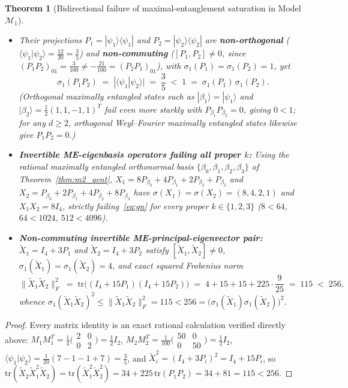 \documentclass[11pt,a4paper]{article}
\theoremstyle{plain}
\newtheorem{theorem}{Theorem}[section]
\theoremstyle{definition}
\newcommand{\tr}{\mathrm{tr}}
\begin{document}
\begin{theorem}[Bidirectional failure of maximal-entanglement saturation in Model $\mathcal{M}_1$]
\begin{enumerate}
\begin{itemize}
      \item Their projections $P_1 = |\psi_1\rangle\langle\psi_1|$ and $P_2 = |\psi_2\rangle\langle\psi_2|$ are \textbf{non-orthogonal} ($\langle\psi_1|\psi_2\rangle = \frac{12}{20} = \frac{3}{5}$) and \textbf{non-commuting} ($[P_1, P_2] \ne 0$, since $(P_1 P_2)_{01} = \frac{3}{100} \ne -\frac{21}{100} = (P_2 P_1)_{01}$), with $\sigma_1(P_1) = \sigma_1(P_2) = 1$, yet
      \[
        \sigma_1(P_1 P_2) \;=\; |\langle\psi_1|\psi_2\rangle| \;=\; \frac{3}{5} \;<\; 1 \;=\; \sigma_1(P_1)\,\sigma_1(P_2).
      \]
      (Orthogonal maximally entangled states such as $|\beta_1\rangle = |\psi_1\rangle$ and $|\beta_2\rangle = \frac{1}{2}(1,1,-1,1)^T$ fail even more starkly with $P_{\beta_1} P_{\beta_2} = 0$, giving $0 < 1$; for any $d \ge 2$, orthogonal Weyl--Fourier maximally entangled states likewise give $P_1 P_2 = 0$.)
      \item \textbf{Invertible ME-eigenbasis operators failing all proper $k$:} Using the rational maximally entangled orthonormal basis $\{\beta_0, \beta_1, \beta_2, \beta_3\}$ of Theorem~\ref{thm:m2_qent}, $X_1 = 8 P_{\beta_0} + 4 P_{\beta_1} + 2 P_{\beta_2} + P_{\beta_3}$ and $X_2 = P_{\beta_0} + 2 P_{\beta_1} + 4 P_{\beta_2} + 8 P_{\beta_3}$ have $\sigma(X_1) = \sigma(X_2) = (8,4,2,1)$ and $X_1 X_2 = 8 I_4$, strictly failing~\eqref{eq:gn} for every proper $k \in \{1,2,3\}$ ($8 < 64$, $64 < 1024$, $512 < 4096$).
      \item \textbf{Non-commuting invertible ME-principal-eigenvector pair:} $\widetilde{X}_1 = I_4 + 3 P_1$ and $\widetilde{X}_2 = I_4 + 3 P_2$ satisfy $[\widetilde{X}_1, \widetilde{X}_2] \ne 0$, $\sigma_1(\widetilde{X}_1) = \sigma_1(\widetilde{X}_2) = 4$, and exact squared Frobenius norm
      \[
        \|\widetilde{X}_1 \widetilde{X}_2\|_F^2 \;=\; \tr\bigl((I_4 + 15 P_1)(I_4 + 15 P_2)\bigr) \;=\; 4 + 15 + 15 + 225 \cdot \frac{9}{25} \;=\; 115 \;<\; 256,
      \]
      whence $\sigma_1(\widetilde{X}_1 \widetilde{X}_2)^2 \le \|\widetilde{X}_1 \widetilde{X}_2\|_F^2 = 115 < 256 = \bigl(\sigma_1(\widetilde{X}_1)\sigma_1(\widetilde{X}_2)\bigr)^2$.
    \end{itemize}
\end{enumerate}
\end{theorem}
\begin{proof}
Every matrix identity is an exact rational calculation verified directly above: $M_1 M_1^T = \frac{1}{4}\bigl(\begin{smallmatrix}2 & 0\\ 0 & 2\end{smallmatrix}\bigr) = \frac{1}{2} I_2$, $M_2 M_2^T = \frac{1}{100}\bigl(\begin{smallmatrix}50 & 0\\ 0 & 50\end{smallmatrix}\bigr) = \frac{1}{2} I_2$, $\langle\psi_1|\psi_2\rangle = \frac{1}{20}(7 - 1 - 1 + 7) = \frac{3}{5}$, and $\widetilde{X}_i^2 = (I_4 + 3 P_i)^2 = I_4 + 15 P_i$, so $\tr(\widetilde{X}_2 \widetilde{X}_1^2 \widetilde{X}_2) = \tr(\widetilde{X}_1^2 \widetilde{X}_2^2) = 34 + 225\,\tr(P_1 P_2) = 34 + 81 = 115 < 256$.
\end{proof}
\end{document}
